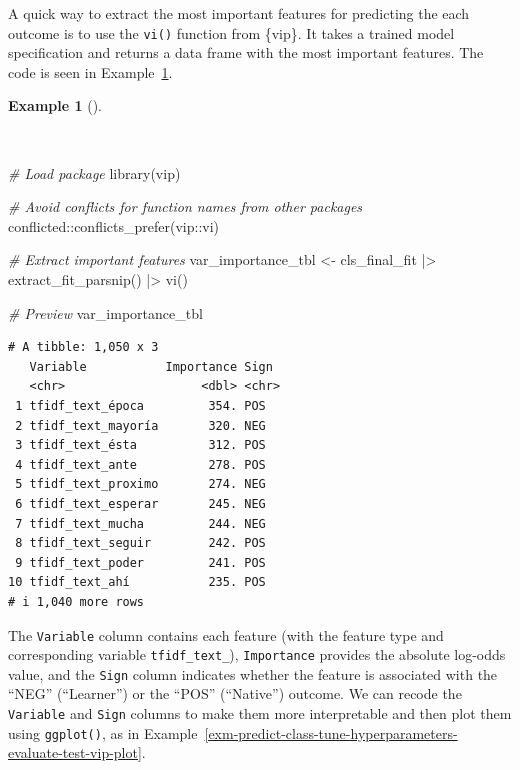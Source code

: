 \documentclass[
  letterpaper,
]{book}
\newenvironment{Shaded}{\begin{snugshade}}{\end{snugshade}}
\newcommand{\CommentTok}[1]{\textcolor[rgb]{0.00,0.00,0.00}{\textit{#1}}}
\newcommand{\FunctionTok}[1]{\textcolor[rgb]{0.00,0.00,0.00}{#1}}
\newcommand{\NormalTok}[1]{\textcolor[rgb]{0.00,0.00,0.00}{#1}}
\newcommand{\OtherTok}[1]{\textcolor[rgb]{0.00,0.00,0.00}{#1}}
\newcommand{\SpecialCharTok}[1]{\textcolor[rgb]{0.00,0.00,0.00}{#1}}
\theoremstyle{definition}
\newtheorem{example}{Example}[chapter]
\theoremstyle{remark}
\begin{document}
A quick way to extract the most important features for predicting the
each outcome is to use the \texttt{vi()} function from \{vip\}. It takes
a trained model specification and returns a data frame with the most
important features. The code is seen in
Example~\ref{exm-predict-class-tune-hyperparameters-evaluate-test-vip}.

\begin{example}[]\protect\hypertarget{exm-predict-class-tune-hyperparameters-evaluate-test-vip}{}\label{exm-predict-class-tune-hyperparameters-evaluate-test-vip}

~

\begin{Shaded}
\begin{Highlighting}[]
\CommentTok{\# Load package}
\FunctionTok{library}\NormalTok{(vip)}

\CommentTok{\# Avoid conflicts for function names from other packages}
\NormalTok{conflicted}\SpecialCharTok{::}\FunctionTok{conflicts\_prefer}\NormalTok{(vip}\SpecialCharTok{::}\NormalTok{vi)}

\CommentTok{\# Extract important features}
\NormalTok{var\_importance\_tbl }\OtherTok{\textless{}{-}}
\NormalTok{  cls\_final\_fit }\SpecialCharTok{|\textgreater{}}
  \FunctionTok{extract\_fit\_parsnip}\NormalTok{() }\SpecialCharTok{|\textgreater{}}
  \FunctionTok{vi}\NormalTok{()}

\CommentTok{\# Preview}
\NormalTok{var\_importance\_tbl}
\end{Highlighting}
\end{Shaded}

\begin{verbatim}
# A tibble: 1,050 x 3
   Variable           Importance Sign 
   <chr>                   <dbl> <chr>
 1 tfidf_text_época         354. POS  
 2 tfidf_text_mayoría       320. NEG  
 3 tfidf_text_ésta          312. POS  
 4 tfidf_text_ante          278. POS  
 5 tfidf_text_proximo       274. NEG  
 6 tfidf_text_esperar       245. NEG  
 7 tfidf_text_mucha         244. NEG  
 8 tfidf_text_seguir        242. POS  
 9 tfidf_text_poder         241. POS  
10 tfidf_text_ahí           235. POS  
# i 1,040 more rows
\end{verbatim}

\end{example}

The \texttt{Variable} column contains each feature (with the feature
type and corresponding variable \texttt{tfidf\_text\_}),
\texttt{Importance} provides the absolute log-odds value, and the
\texttt{Sign} column indicates whether the feature is associated with
the ``NEG'' (``Learner'') or the ``POS'' (``Native'') outcome. We can
recode the \texttt{Variable} and \texttt{Sign} columns to make them more
interpretable and then plot them using \texttt{ggplot()}, as in
Example~\ref{exm-predict-class-tune-hyperparameters-evaluate-test-vip-plot}.
\end{document}

